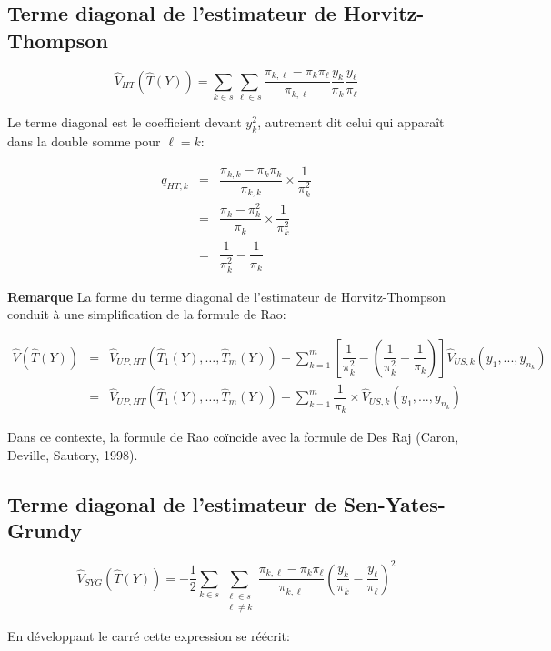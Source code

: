 \documentclass[a4paper,12pt]{article}
\begin{document}
\bigskip \subsection*{Terme diagonal de l'estimateur de Horvitz-Thompson}

$$ \hat{V}_{HT}(\hat{T}(Y)) = \sum \limits_{k \in s} \sum \limits_{\ell \in s} \dfrac{\pi_{k,\ell} - \pi_k \pi_\ell}{\pi_{k,\ell}} \dfrac{y_k}{\pi_k}\dfrac{y_\ell}{\pi_\ell}$$

Le terme diagonal est le coefficient devant $y_k^2$, autrement dit celui qui apparaît dans la double somme pour $\ell = k$:

\begin{eqnarray*}
q_{HT,k} &=& \dfrac{\pi_{k,k} - \pi_k \pi_k}{\pi_{k,k}} \times \dfrac{1}{\pi_k^2} \\
&=& \dfrac{\pi_k - \pi_k^2}{\pi_k} \times \dfrac{1}{\pi_k^2} \\
&=& \dfrac{1}{\pi_k^2} - \dfrac{1}{\pi_k}
\end{eqnarray*}

\textbf{Remarque} La forme du terme diagonal de l'estimateur de Horvitz-Thompson conduit à une simplification de la formule de Rao:

\begin{eqnarray*}
\hat{V}(\hat{T}(Y)) &=& \hat{V}_{UP, HT}(\hat{T}_1(Y), \ldots{},\hat{T}_m(Y)) + \sum_{k = 1}^{m}\left[\dfrac{1}{\pi_k^2} - \left( \dfrac{1}{\pi_k^2} - \dfrac{1}{\pi_k} \right) \right]\hat{V}_{US,k}(y_1,...,y_{n_k}) \\
&=& \hat{V}_{UP, HT}(\hat{T}_1(Y), \ldots{},\hat{T}_m(Y)) + \sum_{k = 1}^{m}\dfrac{1}{\pi_k} \times \hat{V}_{US,k}(y_1,...,y_{n_k})
\end{eqnarray*}

Dans ce contexte, la formule de Rao coïncide avec la formule de Des Raj (Caron, Deville, Sautory, 1998). 

\bigskip \subsection*{Terme diagonal de l'estimateur de Sen-Yates-Grundy}

$$ \hat{V}_{SYG}(\hat{T}(Y)) = -\dfrac{1}{2}\sum \limits_{k \in s} \sum \limits_{\substack{\ell \in s \\ \ell \neq k}} \dfrac{\pi_{k,\ell} - \pi_k \pi_\ell}{\pi_{k,\ell}} \left(\dfrac{y_k}{\pi_k} - \dfrac{y_\ell}{\pi_\ell}\right)^2$$

\bigskip En développant le carré cette expression se réécrit:
\end{document}
